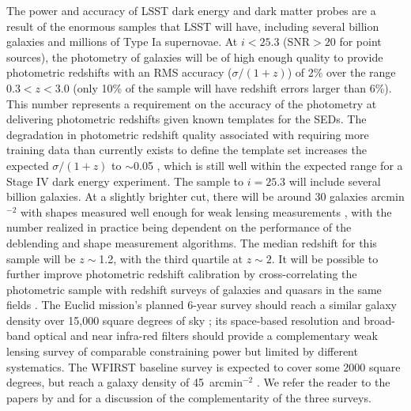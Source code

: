 The power and accuracy of LSST dark energy and dark matter probes are
a result of the enormous samples that LSST will have, including
several billion galaxies and millions of Type Ia
supernovae. At $i < 25.3$ (SNR${}>20$ for point sources), the
photometry of galaxies will be of high enough quality to provide
photometric redshifts with an RMS accuracy ($\sigma/(1+z)$) of 2\%
over the range $0.3 < z < 3.0$ (only 10\% of the sample will have redshift errors larger than 6\%).
This number represents a requirement on the accuracy of the photometry at delivering photometric
redshifts given known templates for the SEDs.  The degradation in photometric redshift quality associated with
requiring more training data than currently exists to define the template set increases the
expected $\sigma/(1+z)$ to $\sim$0.05 \cite[e.g.][]{2015APh....63...81N,2018AJ....155....1G}, which is still well within the
expected range for a Stage IV dark energy experiment.  The
sample to $i=25.3$ will include several billion galaxies.  At a
slightly brighter cut, there will be around 30 galaxies arcmin$^{-2}$
with shapes measured well enough for weak lensing measurements \citep{2013MNRAS.434.2121C,2015MNRAS.447.1746C},
with the number realized in practice being dependent on
the performance of the deblending and shape measurement algorithms.
The median redshift for
this sample will be $z\sim$1.2, with the third quartile at $z\sim2$.
It will be possible to further improve photometric redshift calibration
by cross-correlating the photometric sample with redshift surveys of
galaxies and quasars in the same fields
\citep{2008ApJ...684...88N,2010ApJ...721..456M,2013arXiv1303.4722M,2017arXiv171002517D}.
The Euclid mission's planned 6-year survey should reach a similar galaxy
density over 15,000 square degrees of sky \citep{2011arXiv1110.3193L}; its space-based resolution
and broad-band optical and near infra-red filters should provide a
complementary weak lensing survey of comparable constraining power but
limited by different systematics.
The WFIRST baseline survey is expected to cover some 2000 square degrees, but reach a galaxy density of 45~arcmin$^{-2}$ \citep{2015arXiv150303757S}.
We refer the reader to the
papers by \citet{2015arXiv150107897J} and \citet{2017ApJS..233...21R} for a discussion of the complementarity of the three surveys.

